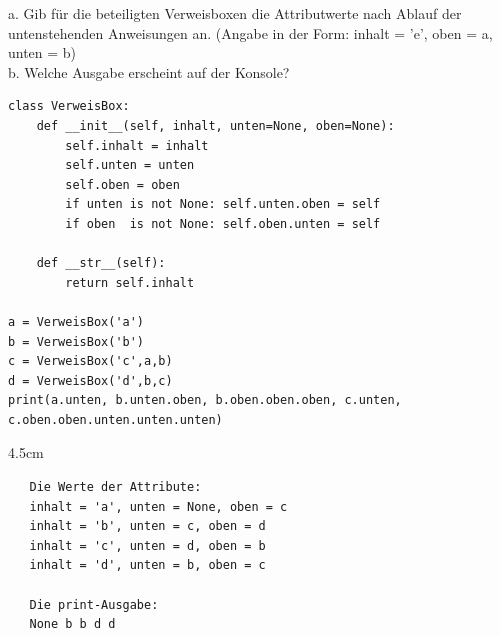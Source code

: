 \question[3]
a. Gib für die beteiligten Verweisboxen die Attributwerte nach Ablauf der untenstehenden Anweisungen an.
(Angabe in der Form:  inhalt = 'e', oben = a, unten = b) \\
b. Welche Ausgabe erscheint auf der Konsole?  
\begin{lstlisting}
class VerweisBox:
    def __init__(self, inhalt, unten=None, oben=None):
        self.inhalt = inhalt
        self.unten = unten
        self.oben = oben
        if unten is not None: self.unten.oben = self
        if oben  is not None: self.oben.unten = self

    def __str__(self):
        return self.inhalt

a = VerweisBox('a')
b = VerweisBox('b')
c = VerweisBox('c',a,b)
d = VerweisBox('d',b,c)
print(a.unten, b.unten.oben, b.oben.oben.oben, c.unten, c.oben.oben.unten.unten.unten)

\end{lstlisting}

\begin{solutionbox}{4.5cm}
\begin{lstlisting}
   Die Werte der Attribute:
   inhalt = 'a', unten = None, oben = c
   inhalt = 'b', unten = c, oben = d
   inhalt = 'c', unten = d, oben = b
   inhalt = 'd', unten = b, oben = c
   
   Die print-Ausgabe:
   None b b d d
\end{lstlisting}
\end{solutionbox}
